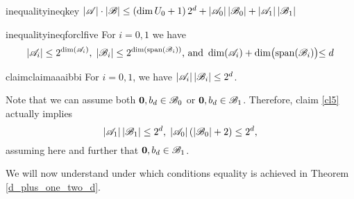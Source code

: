 \begin{restatable}{inequality}{ineqkey}\label{in1}
    $\left|{\mathscr{A}}\right| \cdot\left|{\mathscr{B}}\right| \leq \left(\operatorname{dim} U_0+1\right) 2^d+\left|{\mathscr{A}}_0\right|\left|{\mathscr{B}}_0\right|+\left|{\mathscr{A}}_1\right|\left|{\mathscr{B}}_1\right|$
\end{restatable}

\begin{restatable}{inequality}{ineqforclfive}\label{ineqForCl5}
    For $i = 0,1$ we have 
    \[
        |{\mathscr{A}}_i| \leq 2^{\operatorname{dim}({\mathscr{A}}_i)},\;|{\mathscr{B}}_i| \leq 2^{\operatorname{dim}(\operatorname{span}({\mathscr{B}}_i))} \text{, and } \operatorname{dim}({\mathscr{A}}_i) + \operatorname{dim}\bigl(\operatorname{span}({\mathscr{B}}_i)\bigl) \leq d
    \]
\end{restatable}

\begin{restatable}{claim}{claimaaaibbi}\label{cl5}
    For $i=0, 1$, we have $\left|{\mathscr{A}}_i\right|\left|{\mathscr{B}}_i\right| \leq 2^d$.
\end{restatable}

\noindent Note that we can assume both  $\mathbf{0}, b_d \in {\mathscr{B}}_0$ or $\mathbf{0}, b_d \in {\mathscr{B}}_1$. Therefore, claim \ref{cl5} actually implies
\begin{equation}\label{stronger5}
    \left|{\mathscr{A}}_1\right|\left|{\mathscr{B}}_1\right| \leq 2^d,\; \left|{\mathscr{A}}_0\right|\left(\left|{\mathscr{B}}_0\right|+2\right)\leq 2^d,
\end{equation}
assuming here and further that $\mathbf{0}, b_d \in {\mathscr{B}}_1$.

\noindent We will now understand under which conditions equality is achieved in Theorem \ref{d_plus_one_two_d}.

